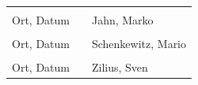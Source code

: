 \documentclass[
	12pt, %
	a4paper,
	listof=totoc, %
	bibliography=totoc, %
	numbers=noenddot, %
	ngerman, %
	headsepline, %
	oneside %
	]{scrbook} %
\newcommand{\studentNameEins}{Jahn, Marko}
\newcommand{\studentNameZwei}{Schenkewitz, Mario}
\newcommand{\studentNameDrei}{Zilius, Sven}
\begin{document}
\begin{tabular}{lp{4em}l} 
 \hspace{5cm}   && \hspace{6cm} \\\cline{1-1}\cline{3-3} 
 Ort, Datum     && \studentNameEins \\ [10ex]
 \hspace{5cm}   && \hspace{6cm} \\\cline{1-1}\cline{3-3} 
 Ort, Datum     && \studentNameZwei \\ [10ex]
 \hspace{5cm}   && \hspace{6cm} \\\cline{1-1}\cline{3-3} 
 Ort, Datum     && \studentNameDrei \\ [10ex]
\end{tabular}
\end{document}
